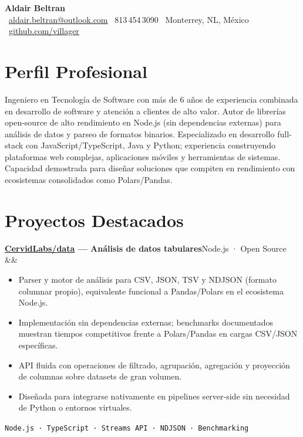 \documentclass[10pt, letterpaper]{article}
\newcommand{\entry}[3]{%
  \noindent\textbf{#1}\hfill\textcolor{muted}{\small #2}%
  \ifx&#3&\else\\\textcolor{muted}{\small #3}\fi%
  \par\vspace{0.1em}%
}
\begin{document}
\pagestyle{empty}

\begin{center}
  {\LARGE\bfseries Aldair Beltran}\\[0.4em]
  {\small
    \faEnvelope\ \href{mailto:aldair.beltran@outlook.com}{aldair.beltran@outlook.com}\quad
    \faPhone\ 813\,454\,3090\quad
    \faMapMarker*\ Monterrey, NL, México\\[0.3em]
    \faGithub\ \href{https://github.com/villager}{github.com/villager}\quad
  }
\end{center}

\vspace{0.2em}

\section{Perfil Profesional}

Ingeniero en Tecnología de Software con más de 6 años de experiencia combinada en desarrollo de
software y atención a clientes de alto valor. Autor de librerías open-source de alto rendimiento en
Node.js (sin dependencias externas) para análisis de datos y parseo de formatos binarios.
Especializado en desarrollo full-stack con JavaScript/TypeScript, Java y Python; experiencia
construyendo plataformas web complejas, aplicaciones móviles y herramientas de sistemas. Capacidad demostrada para
diseñar soluciones que compiten en rendimiento con ecosistemas consolidados como Polars/Pandas.

\section{Proyectos Destacados}

\entry{\href{https://github.com/CervidLabs/data}{CervidLabs/data} — Análisis de datos tabulares}{Node.js · Open Source}{}
\begin{itemize}
  \item Parser y motor de análisis para CSV, JSON, TSV y NDJSON (formato columnar propio), equivalente
        funcional a Pandas/Polars en el ecosistema Node.js.
  \item Implementación sin dependencias externas; benchmarks documentados muestran tiempos competitivos
        frente a Polars/Pandas en cargas CSV/JSON específicas.
  \item API fluida con operaciones de filtrado, agrupación, agregación y proyección de columnas sobre
        datasets de gran volumen.
  \item Diseñada para integrarse nativamente en pipelines server-side sin necesidad de Python o entornos virtuales.
\end{itemize}
\vspace{0.2em}
\textcolor{muted}{\small \texttt{Node.js · TypeScript · Streams API · NDJSON · Benchmarking}}
\end{document}
